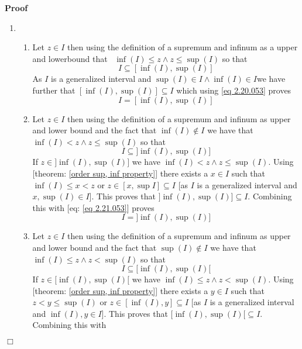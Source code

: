 \documentclass{book}
\newcommand{\nin}{\not\in}
\newenvironment{proof}{\noindent\textbf{Proof\ }}{\hspace*{\fill}$\Box$\medskip}
\begin{document}
\begin{proof}
  
  \begin{enumerate}
    \item 
    \begin{enumerate}
      \item Let $z \in I$ then using the definition of a supremum and infinum
      as a upper and lowerbound that \ $\inf (I) \leqslant z \wedge z
      \leqslant \sup (I)$ so that
      \begin{equation}
        \label{eq 2.20.053} I \subseteq [\inf (I), \sup (I)]
      \end{equation}
      As $I$ is a generalized interval and $\sup (I) \in I \wedge \inf (I) \in
      I$we have further that $[\inf (I), \sup (I)] \subseteq I$ which using
      \ref{eq 2.20.053} proves
      \[ I = [\inf (I), \sup (I)] \]
      \item Let $z \in I$ then using the definition of a supremum and infinum
      as upper and lower bound and the fact that $\inf (I) \nin I$ we have
      that $\inf (I) < z \wedge z \leqslant \sup (I)$ so that
      \begin{equation}
        \label{eq 2.21.053} I \subseteq] \inf (I), \sup (I)]
      \end{equation}
      If $z \in] \inf (I), \sup (I)]$ we have $\inf (I) < z \wedge z \leqslant
      \sup (I)$. Using [theorem: \ref{order sup, inf property}] there exists a
      $x \in I$ such that $\inf (I) \leqslant x < z$ or $z \in [x, \sup I]
      \subseteq I$ [as $I$ is a generalized interval and $x, \sup (I) \in I$].
      This proves that $] \inf (I), \sup (I)] \subseteq I$. Combining this
      with [eq: \ref{eq 2.21.053}] proves
      \[ I =] \inf (I), \sup (I)] \]
      \item Let $z \in I$ then using the definition of a supremum and infinum
      as upper and lower bound and the fact that $\sup (I) \nin I$ we have
      that $\inf (I) \leqslant z \wedge z < \sup (I)$ so that
      \begin{equation}
        \label{eq 2.22.053} I \subseteq [\inf (I), \sup (I) [
      \end{equation}
      If $z \in [\inf (I), \sup (I) [$ we have $\inf (I) \leqslant z \wedge z
      < \sup (I)$. Using [theorem: \ref{order sup, inf property}] there exists
      a $y \in I$ such that $z < y \leqslant \sup (I)$ or $z \in [\inf (I), y]
      \subseteq I$ [as $I$ is a generalized interval and $\inf (I), y \in I$].
      This proves that $[\inf (I), \sup (I) [\subseteq I$. Combining this with

\end{enumerate}
\end{enumerate}
\end{proof}
\end{document}
